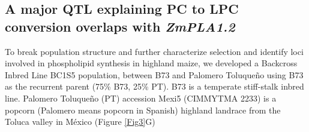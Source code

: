 \documentclass[9pt,twocolumn,twoside]{BioRxiv}
\begin{document}
\subsection{A major QTL explaining PC to LPC conversion overlaps with \textit{ZmPLA1.2}} 

To break population structure and further characterize selection and identify loci involved in phospholipid synthesis in highland maize, we developed a Backcross Inbred  Line BC1S5 population, between B73 and Palomero Toluqueño using B73 as the recurrent parent (75\% B73, 25\% PT). 
B73 is a temperate stiff-stalk inbred line. Palomero Toluqueño (PT) accession Mexi5 (CIMMYTMA 2233) is a popcorn (Palomero means popcorn in Spanish) highland landrace from the Toluca valley in México (Figure \ref{Fig3}G) 
\end{document}
